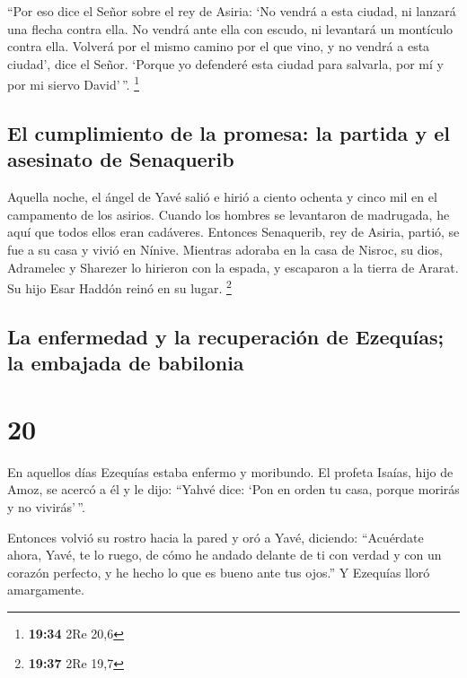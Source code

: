  ``Por eso dice el Señor sobre el rey de Asiria: `No
vendrá a esta ciudad, ni lanzará una flecha contra ella. No vendrá ante
ella con escudo, ni levantará un montículo contra ella. 
Volverá por el mismo camino por el que vino, y no vendrá a esta ciudad',
dice el Señor.  `Porque yo defenderé esta ciudad para
salvarla, por mí y por mi siervo David'\,''. \footnote{\textbf{19:34}
  2Re 20,6}

\hypertarget{el-cumplimiento-de-la-promesa-la-partida-y-el-asesinato-de-senaquerib}{%
\subsection{El cumplimiento de la promesa: la partida y el asesinato de
Senaquerib}\label{el-cumplimiento-de-la-promesa-la-partida-y-el-asesinato-de-senaquerib}}

 Aquella noche, el ángel de Yavé salió e hirió a ciento
ochenta y cinco mil en el campamento de los asirios. Cuando los hombres
se levantaron de madrugada, he aquí que todos ellos eran cadáveres.
 Entonces Senaquerib, rey de Asiria, partió, se fue a su
casa y vivió en Nínive.  Mientras adoraba en la casa de
Nisroc, su dios, Adramelec y Sharezer lo hirieron con la espada, y
escaparon a la tierra de Ararat. Su hijo Esar Haddón reinó en su lugar.
\footnote{\textbf{19:37} 2Re 19,7}

\hypertarget{la-enfermedad-y-la-recuperaciuxf3n-de-ezequuxedas-la-embajada-de-babilonia}{%
\subsection{La enfermedad y la recuperación de Ezequías; la embajada de
babilonia}\label{la-enfermedad-y-la-recuperaciuxf3n-de-ezequuxedas-la-embajada-de-babilonia}}

\hypertarget{section-19}{%
\section{20}\label{section-19}}

 En aquellos días Ezequías estaba enfermo y moribundo. El
profeta Isaías, hijo de Amoz, se acercó a él y le dijo: ``Yahvé dice:
`Pon en orden tu casa, porque morirás y no vivirás'\,''.

 Entonces volvió su rostro hacia la pared y oró a Yavé,
diciendo:  ``Acuérdate ahora, Yavé, te lo ruego, de cómo
he andado delante de ti con verdad y con un corazón perfecto, y he hecho
lo que es bueno ante tus ojos.'' Y Ezequías lloró amargamente.

